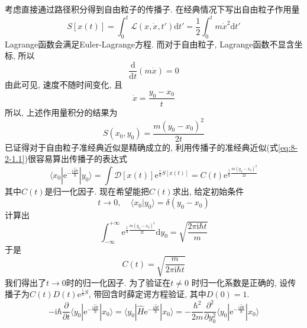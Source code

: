         考虑直接通过路径积分得到自由粒子的传播子. 在经典情况下写出自由粒子作用量
        \begin{equation}
            S[x(t)] = \int_0^t \mathcal{L}(x,\dot{x},t') \mathrm{d}t' = \frac 12 \int_0^t m\dot{x}^2 \mathrm{d}t'
        \end{equation}
        Lagrange函数会满足Euler-Lagrange方程. 而对于自由粒子, Lagrange函数不显含坐标, 所以
        \begin{equation}
            \frac {\mathrm{d}}{\mathrm{d}t} (m \dot x) = 0
        \end{equation}
        由此可见, 速度不随时间变化, 且
        \begin{equation}
            \dot{x} = \frac{y_0 - x_0}t
        \end{equation}
        所以, 上述作用量积分的结果为
        \begin{equation}
            S(x_0, y_0) = \frac{m(y_0 - x_0)^2}{2t}
        \end{equation}
        已证得对于自由粒子准经典近似是精确成立的, 利用传播子的准经典近似(式\ref{eq:8-2-1.1})很容易算出传播子的表达式
        \begin{equation}
            \langle x_0 | \mathrm{e}^{-\frac {\mathrm{i}\hat{H}t}{\hbar}} | y_0 \rangle = \int \mathcal{D}[x(t)] \mathrm{e}^{ \frac{\mathrm{i}}{\hbar} S[x(t)] } = C(t) \mathrm{e}^{\frac {\mathrm{i}}{\hbar} \frac{m(y_0 - x_0)^2}{2t}}
        \end{equation}
        其中$C(t)$是归一化因子. 现在希望能把$C(t)$求出, 给定初始条件
        \begin{equation}
            t \to 0,~~~~~\langle x_0|y_0\rangle = \delta(y_0-x_0)
        \end{equation}
        计算出
        \begin{equation}
            \int_{-\infty}^{+\infty} \mathrm{e}^{\frac {\mathrm{i}}{\hbar} \frac {m(y_0 - x_0)^2}{2t}}\mathrm{d}y_0 = \sqrt{\frac {2\pi\mathrm{i}\hbar t}m}
        \end{equation}
        于是
        \begin{equation}\label{eq:8-2-3}
            C(t) = \sqrt{\frac m{2\pi\mathrm{i}\hbar t}}
        \end{equation}
        我们得出了$t \to 0$时的归一化因子. 为了验证在$t \neq 0$ 时归一化系数是正确的, 设传播子为$C(t) D(t) \mathrm{e}^{\frac{\mathrm{i}}{\hbar}S}$, 带回含时薛定谔方程验证, 其中$D(0) = 1$.
        \begin{equation}
            -\mathrm{i}\hbar \frac {\partial}{\partial t} \langle y_0 | \mathrm{e}^{-\frac {\mathrm{i}\hat{H}t}{\hbar}} |x_0 \rangle =  \langle y_0 | \hat{H} \mathrm{e}^{-\frac {\mathrm{i}\hat{H}t}{\hbar}} |x_0 \rangle = -\frac {\hbar^2}{2m} \frac {\partial^2}{\partial y_0^2} \langle y_0 | \mathrm{e}^{-\frac {\mathrm{i}\hat{H}t}{\hbar}} |x_0 \rangle
        \end{equation}
